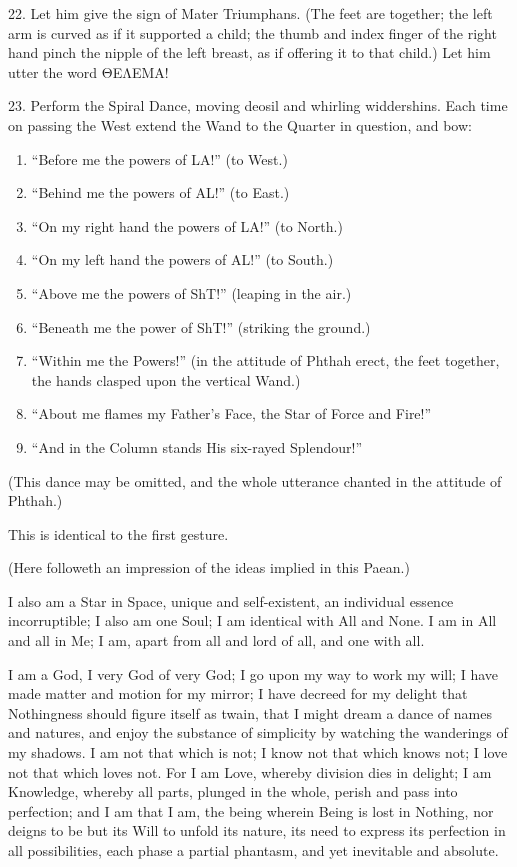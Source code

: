 22. Let him give the sign of Mater Triumphans. (The feet are together; the left arm is curved as if it supported a child; the thumb and index finger of the right hand pinch the nipple of the left breast, as if offering it to that child.) Let him utter the word ΘΕΛΕΜΑ!

23. Perform the Spiral Dance, moving deosil and whirling widdershins. Each time on passing the West extend the Wand to the Quarter in question, and bow:

\begin{enumerate}[label=\alph*.]
\item \enquote{Before me the powers of LA!} (to West.)
\item \enquote{Behind me the powers of AL!} (to East.)
\item \enquote{On my right hand the powers of LA!} (to North.)
\item \enquote{On my left hand the powers of AL!} (to South.)
\item \enquote{Above me the powers of ShT!} (leaping in the air.)
\item \enquote{Beneath me the power of ShT!} (striking the ground.)
\item \enquote{Within me the Powers!} (in the attitude of Phthah erect, the feet together, the hands clasped upon the vertical Wand.)
\item \enquote{About me flames my Father's Face, the Star of Force and Fire!}
\item \enquote{And in the Column stands His six-rayed Splendour!}
\end{enumerate}

(This dance may be omitted, and the whole utterance chanted in the attitude of Phthah.)


This is identical to the first gesture.

\raggedbottom\pagebreak

(Here followeth an impression of the ideas implied in this Paean.)


I also am a Star in Space, unique and self-existent, an individual
essence incorruptible; I also am one Soul; I am identical with All
and None. I am in All and all in Me; I am, apart from all and
lord of all, and one with all.

I am a God, I very God of very God; I go upon my way to work my will; I have made matter and motion for my mirror; I have decreed for my delight that Nothingness should figure itself as twain, that I might dream a dance of names and natures, and enjoy the substance of simplicity by watching the wanderings of my shadows. I am not that which is not; I know not that which knows not; I love not that which loves not. For I am Love, whereby division dies in delight; I am Knowledge, whereby all parts, plunged in the whole, perish and pass into perfection; and I am that I am, the being wherein Being is lost in Nothing, nor deigns to be but its Will to unfold its nature, its need to express its perfection in all possibilities, each phase a partial phantasm, and yet inevitable and absolute.

